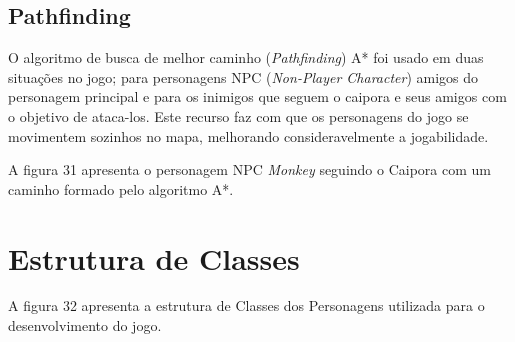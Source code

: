 	
	
\subsection{Pathfinding}
O algoritmo de busca de melhor caminho (\textit{Pathfinding}) A* foi usado em duas situações no jogo; para personagens NPC (\textit{Non-Player Character}) amigos do personagem principal e para os inimigos que seguem o caipora e seus amigos com o objetivo de ataca-los.  Este recurso faz com que os personagens do jogo se movimentem sozinhos no mapa, melhorando consideravelmente a jogabilidade.


A figura 31 apresenta o personagem NPC \textit{Monkey} seguindo o Caipora com um caminho formado pelo algoritmo A*.

\begin{figure}[h!]
		\centering
	\end{figure}
	
	\pagebreak
	
	
	\section{Estrutura de Classes}
	A figura 32 apresenta a estrutura de Classes dos Personagens utilizada para o desenvolvimento do jogo.
	

